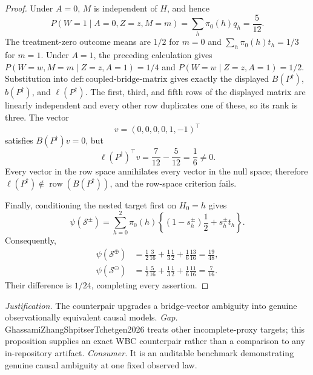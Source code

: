 \documentclass{article}
\begin{document}
\begin{proof}
Under \(A=0\), \(M\) is independent of \(H\), and hence
\[
 P(W=1\mid A=0,Z=z,M=m)=\sum_h\pi _0(h)q_h=\frac5{12}.
\]
The treatment-zero outcome means are \(1/2\) for \(m=0\) and
\(\sum_h\pi _0(h)t_h=1/3\) for \(m=1\).  Under \(A=1\), the preceding
calculation gives \(P(W=w,M=m\mid Z=z,A=1)=1/4\) and
\(P(W=w\mid Z=z,A=1)=1/2\).  Substitution into
\(\mathrm{def{:}coupled\text{-}bridge\text{-}matrix}\) gives exactly the
displayed \(B(P^{\dagger})\), \(b(P^{\dagger})\), and
\(\ell(P^{\dagger})\).  The first, third, and fifth rows of the displayed
matrix are linearly independent and every other row duplicates one of these,
so its rank is three.  The vector
\[
 v=(0,0,0,0,1,-1)^{\top}
\]
satisfies \(B(P^{\dagger})v=0\), but
\[
 \ell(P^{\dagger})^{\top}v=\frac7{12}-\frac5{12}=\frac16\ne0.
\]
Every vector in the row space annihilates every vector in the null space;
therefore \(\ell(P^{\dagger})\notin
\operatorname{row}(B(P^{\dagger}))\), and the row-space criterion fails.

Finally, conditioning the nested target first on \(H_0=h\) gives
\[
 \psi(\mathcal S^{\pm})
 =\sum_{h=0}^2\pi _0(h)
 \left\{(1-s_h^{\pm})\frac12+s_h^{\pm}t_h\right\}.
\]
Consequently,
\[
\begin{aligned}
 \psi(\mathcal S^{\oplus})
 &=\frac12\frac3{16}+\frac13\frac12+\frac16\frac{13}{16}
   =\frac{19}{48},\\
 \psi(\mathcal S^{\ominus})
 &=\frac12\frac5{16}+\frac13\frac12+\frac16\frac{11}{16}
   =\frac7{16}.
\end{aligned}
\]
Their difference is \(1/24\), completing every assertion.
\end{proof}
\par\smallskip\noindent \textit{Justification.} The counterpair upgrades a bridge-vector ambiguity into genuine observationally equivalent causal models. \textit{Gap.} GhassamiZhangShpitserTchetgen2026 treats other incomplete-proxy targets; this proposition supplies an exact WBC counterpair rather than a comparison to any in-repository artifact. \textit{Consumer.} It is an auditable benchmark demonstrating genuine causal ambiguity at one fixed observed law.
\end{document}
